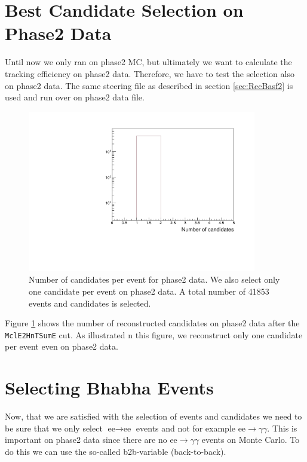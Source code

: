 \documentclass[a4paper,11pt,twosided,final,german,openbib,pdftex,listof=totoc,bibliography=totoc]{scrbook}
\begin{document}
\section{Best Candidate Selection on Phase2 Data}
\label{sec:SelectingBhabhaData}

Until now we only ran on phase2 MC, but ultimately we want to calculate the tracking efficiency on phase2 data. Therefore, we have to test the selection also on phase2 data. The same steering file as described in section \ref{sec:RecBasf2} is used and run over on phase2 data file. 

\begin{figure}[h!]
	\centering
	\includegraphics[width=10cm]{Cuts/Data/nCandData.pdf}
	\caption[Number Of Candidates Per Event for Phase2 Data (All Cuts)]{Number of candidates per event for phase2 data. We also select only one candidate per event on phase2 data. A total number of 41853 events and candidates is selected.}
	\label{fig:nCandData}
\end{figure}

Figure \ref{fig:nCandData} shows the number of reconstructed candidates on phase2 data after the \texttt{MclE2HnTSumE} cut. As illustrated n this figure, we reconstruct only one candidate per event even on phase2 data.



\section{Selecting Bhabha Events}
\label{sec:SelectingElectronPositron}

Now, that we are satisfied with the selection of events and candidates we need to be sure that we only select $\textrm{ee} \rightarrow \textrm{ee}$ events and not for example $\textrm{ee} \rightarrow \gamma \gamma$. This is important on phase2 data since there are no $\textrm{ee} \rightarrow \gamma \gamma$ events on Monte Carlo. To do this we can use the so-called b2b-variable (back-to-back).
\end{document}
